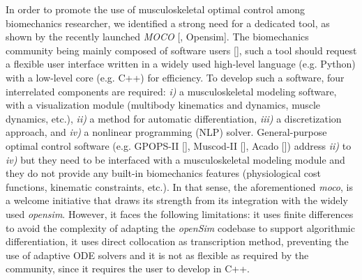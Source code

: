 In order to promote the use of musculoskeletal optimal control among biomechanics researcher, we identified a strong need for a dedicated tool, as shown by the recently launched \textit{MOCO} [\addref, Opensim]. 
The biomechanics community being mainly composed of software users [\addref], such a tool should request a flexible user interface written in a widely used high-level language (e.g. Python) with a low-level core (e.g. C++) for efficiency. 
To develop such a software, four interrelated components are required: \textit{i)} a musculoskeletal modeling software, with a visualization module (multibody kinematics and dynamics, muscle dynamics, etc.), \textit{ii)} a method for automatic differentiation, \textit{iii)} a discretization approach, and \textit{iv)} a nonlinear programming (NLP) solver. 
General-purpose optimal control software (e.g. GPOPS-II [\addref], Muscod-II [\addref], Acado [\addref]) address \textit{ii)} to \textit{iv)} but they need to be interfaced with a musculoskeletal modeling module and they do not provide any built-in biomechanics features (physiological cost functions, kinematic constraints, etc.). 
In that sense, the aforementioned \textit{moco}, is a welcome initiative that draws its strength from its integration with the widely used \textit{opensim}.
However, it faces the following limitations: it uses finite differences to avoid the complexity of adapting the \textit{openSim} codebase to support algorithmic differentiation, it uses direct collocation as transcription method, preventing the use of adaptive ODE solvers and it is not as flexible as required by the community, since it requires the user to develop in C++. 




